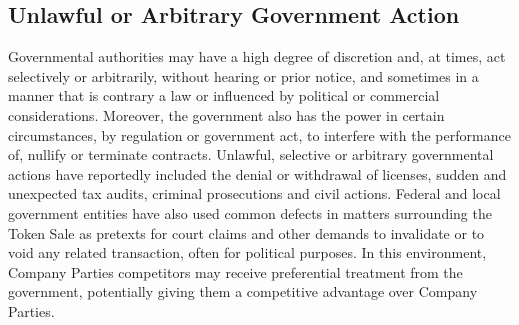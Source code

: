 \documentclass[12pt]{report}
\begin{document}
\begin{multicols}{2}
\subsection{Unlawful or Arbitrary Government Action}
Governmental authorities may have a high degree of discretion and, at times, act selectively or arbitrarily, without hearing or prior notice, and sometimes in a manner that is contrary a law or influenced by political or commercial considerations. Moreover, the government also has the power in certain circumstances, by regulation or government act, to interfere with the performance of, nullify or terminate contracts. Unlawful, selective or arbitrary governmental actions have reportedly included the denial or withdrawal of licenses, sudden and unexpected tax audits, criminal prosecutions and civil actions. Federal and local government entities have also used common defects in matters surrounding the Token Sale as pretexts for court claims and other demands to invalidate or to void any related transaction, often for political purposes. In this environment, Company Parties competitors may receive preferential treatment from the government, potentially giving them a competitive advantage over Company Parties.

\end{multicols}
\end{document}
